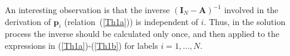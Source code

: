 \documentclass[10pt, conference, letterpaper]{IEEEtran}
\newtheorem{theo}{Theorem}
\newcommand{\blue}[1]{\textcolor{blue}{#1}}
\begin{document}
{%



An interesting observation is that the inverse $(\mathbf{I}_N-\mathbf{A})^{-1}$ involved in the derivation of $\mathbf{p}_i$ (relation~(\ref{Th1a})) is independent of $i$. Thus, in the solution process the inverse should be calculated only once, and then applied to the expressions in (\ref{Th1a})-(\ref{Th1b}) for labels $i=1,\ldots,N$.

}
\end{document}

